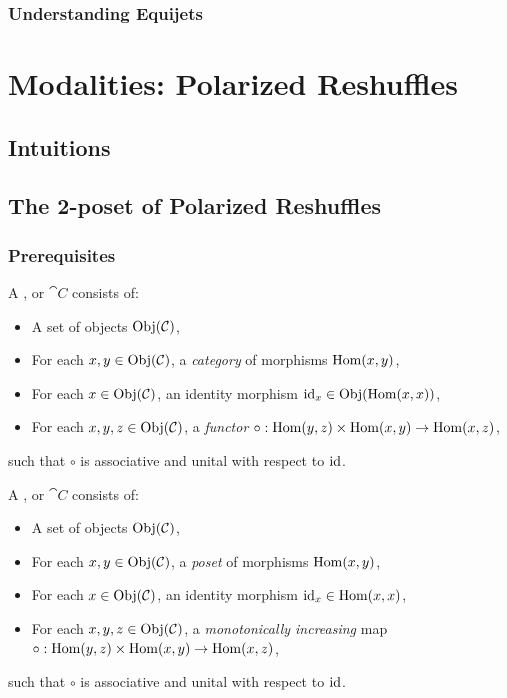 \documentclass[a4paper]{memoir}
\begin{document}
\subsection{Understanding Equijets}

\chapter{Modalities: Polarized Reshuffles} \label{ch:modalities}

\section{Intuitions}

\section{The 2-poset of Polarized Reshuffles} \label{sec:poreshcat}

\subsection{Prerequisites}
\begin{definition}
	A ,  or  $\cat C$ consists of:
	\begin{itemize}
		\item A set of objects $\mathrm{Obj}(\mathcal{C})$,
		\item For each $x, y \in \mathrm{Obj}(\mathcal{C})$, a \emph{category} of morphisms ${\mathrm{Hom}}(x, y)$,
		\item For each $x \in \mathrm{Obj}(\mathcal{C})$, an identity morphism $\mathrm{id}_x \in \mathrm{Obj}({\mathrm{Hom}}(x, x))$,
		\item For each $x, y, z \in \mathrm{Obj}(\mathcal{C})$, a \emph{functor} $\circ : {\mathrm{Hom}}(y, z) \times {\mathrm{Hom}}(x, y) \to {\mathrm{Hom}}(x, z)$,
	\end{itemize}
	such that $\circ$ is associative and unital with respect to $\mathrm{id}$.
\end{definition}
\begin{definition}
	A ,  or  $\cat C$ consists of:
	\begin{itemize}
		\item A set of objects $\mathrm{Obj}(\mathcal{C})$,
		\item For each $x, y \in \mathrm{Obj}(\mathcal{C})$, a \emph{poset} of morphisms ${\mathrm{Hom}}(x, y)$,
		\item For each $x \in \mathrm{Obj}(\mathcal{C})$, an identity morphism $\mathrm{id}_x \in {\mathrm{Hom}}(x, x)$,
		\item For each $x, y, z \in \mathrm{Obj}(\mathcal{C})$, a \emph{monotonically increasing} map $\circ : {\mathrm{Hom}}(y, z) \times {\mathrm{Hom}}(x, y) \to {\mathrm{Hom}}(x, z)$,
	\end{itemize}
	such that $\circ$ is associative and unital with respect to $\mathrm{id}$.
\end{definition}
\end{document}
